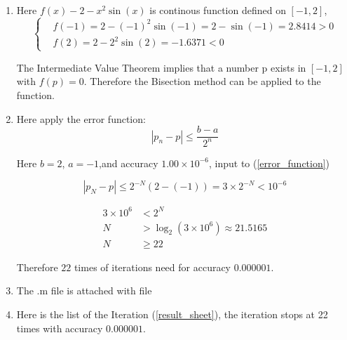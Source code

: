 \begin{solution}\ \\
\begin{enumerate}[label=(\alph*)]
	\item
Here $f(x)-2-x^2 \sin(x)$ is continous function defined on $[-1,2]$,
\begin{equation}
	\left \{
	\begin{aligned}
		&f(-1)=2-(-1)^2 \sin(-1)=2-\sin(-1)=2.8414>0\\
		&f(2)=2-2^2 \sin (2)=-1.6371<0
	\end{aligned}
	\right.
\end{equation}

The Intermediate Value Theorem implies that a number p exists in $[-1,2]$ with $f(p) = 0$. Therefore the Bisection method can be applied to the function.

\item

Here apply the error function:
\begin{equation}
	\left|p_{n}-p\right| \leq \frac{b-a}{2^{n}} \label{error_function}
\end{equation}

Here $b=2$, $a=-1$,and accuracy $1.00 \times 10^{-6}$, input to (\ref{error_function})


\begin{equation*}
	\left|p_{N}-p\right| \leq 2^{-N}(2-(-1))=3 \times 2^{-N}<10^{-6}
\end{equation*}

\begin{equation*}
\begin{aligned}
	3 \times 10^6&<2^N\\
	N&> \log_2(3 \times 10^6) \approx 21.5165\\
	N& \geq 22
\end{aligned}	
\end{equation*}

Therefore $22$ times of iterations need for accuracy $0.000001$. 

\item The .m file is attached with file


\item
Here is the list of the Iteration (\ref{result_sheet}), the iteration stops at 22 times with accuracy $0.000001$.




\end{enumerate}
\end{solution}
